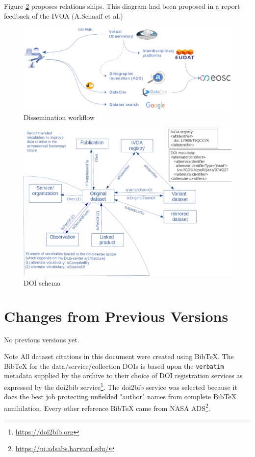 \documentclass[11pt,a4paper]{ivoa}
\begin{document}
Figure \ref{fig:doi-schema} proposes relations ships. This diagram had been proposed in a report feedback of the IVOA (A.Schaaff et al.)

\begin{figure}[!h]
\centering
\includegraphics[width=\textwidth]{diag_dissemination2.eps}
\caption{Dissemination workflow}
\label{fig:diag-dissemination}
\end{figure}

\begin{figure}[!h]
	\centering
	\includegraphics[width=\textwidth]{schema-doi.png}
	\caption{DOI schema}
	\label{fig:doi-schema}
\end{figure}


\section{Changes from Previous Versions}

No previous versions yet.

\clearpage
\begin{admonition}{Note}
	All dataset citations in this document were created using BibTeX. The BibTeX for the data/service/collection DOIs is based upon the \texttt{verbatim} metadata supplied by the archive to their choice of DOI registration services as expressed by the doi2bib service\footnote{\url{https://doi2bib.org}}. The doi2bib service was selected because it does the best job protecting unfielded "author" names from complete BibTeX annihilation.
	Every other reference BibTeX came from NASA ADS\footnote{\url{https://ui.adsabs.harvard.edu/}}.
\end{admonition}

%

	
\end{document}
